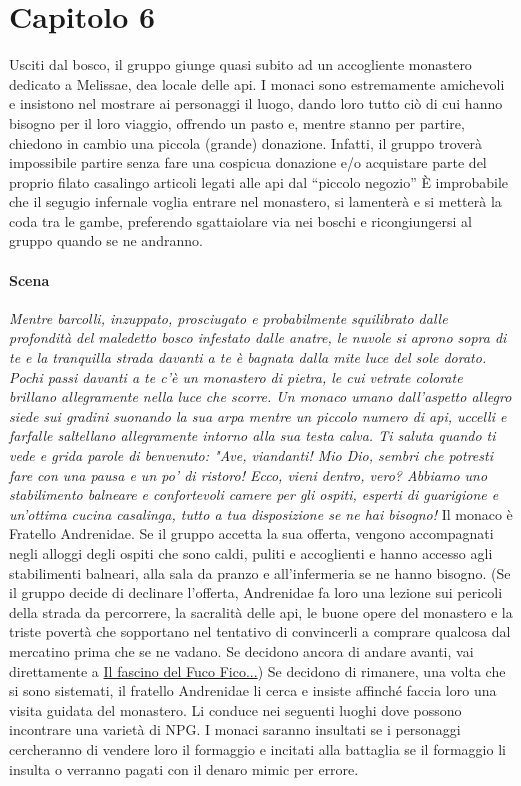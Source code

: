 \documentclass{article}
\begin{document}
\section{Capitolo 6 }
Usciti dal bosco, il gruppo giunge quasi subito ad un accogliente monastero dedicato a Melissae, dea locale delle api.
I monaci sono estremamente amichevoli e insistono nel mostrare ai personaggi il luogo, dando loro tutto ciò di cui hanno bisogno per il loro viaggio, offrendo un pasto e, mentre stanno per partire, chiedono in cambio una piccola (grande) donazione.
Infatti, il gruppo troverà impossibile partire senza fare una cospicua donazione e/o acquistare parte del proprio filato casalingo articoli legati alle api dal “piccolo negozio” È improbabile che il segugio infernale voglia entrare nel monastero, si lamenterà e si metterà la coda tra le gambe, preferendo sgattaiolare via nei boschi e ricongiungersi al gruppo quando se ne andranno.

\paragraph{Scena}\textit{Mentre barcolli, inzuppato, prosciugato e probabilmente squilibrato dalle profondità del maledetto bosco infestato dalle anatre, le nuvole si aprono sopra di te e la tranquilla strada davanti a te è bagnata dalla mite luce del sole dorato. Pochi passi davanti a te c'è un monastero di pietra, le cui vetrate colorate brillano allegramente nella luce che scorre. Un monaco umano dall'aspetto allegro siede sui gradini suonando la sua arpa mentre un piccolo numero di api, uccelli e farfalle saltellano allegramente intorno alla sua testa calva. Ti saluta quando ti vede e grida parole di benvenuto: "Ave, viandanti! Mio Dio, sembri che potresti fare con una pausa e un po' di ristoro! Ecco, vieni dentro, vero? Abbiamo uno stabilimento balneare e confortevoli camere per gli ospiti, esperti di guarigione e un'ottima cucina casalinga, tutto a tua disposizione se ne hai bisogno!}
Il monaco è Fratello Andrenidae. Se il gruppo accetta la sua offerta, vengono accompagnati negli alloggi degli ospiti che sono caldi, puliti e accoglienti e hanno accesso agli stabilimenti balneari, alla sala da pranzo e all'infermeria se ne hanno bisogno.
(Se il gruppo decide di declinare l'offerta, Andrenidae fa loro una lezione sui pericoli della strada da percorrere, la sacralità delle api, le buone opere del monastero e la triste povertà che sopportano nel tentativo di convincerli a comprare qualcosa dal mercatino prima che se ne vadano. Se decidono ancora di andare avanti, vai direttamente a \hyperlink{fuco}{Il fascino del Fuco Fico...})
Se decidono di rimanere, una volta che si sono sistemati, il fratello Andrenidae li cerca e insiste affinché faccia loro una visita guidata del monastero.
Li conduce nei seguenti luoghi dove possono incontrare una varietà di NPG.
I monaci saranno insultati se i personaggi cercheranno di vendere loro il formaggio e incitati alla battaglia se il formaggio li insulta o verranno pagati con il denaro mimic per errore.
\end{document}
